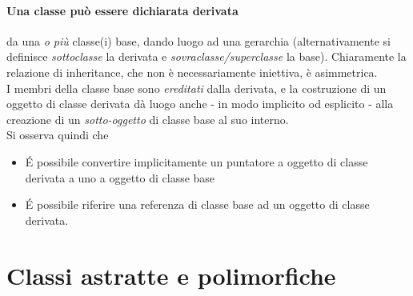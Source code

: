 \documentclass[10pt, oneside]{book}
\begin{document}
\paragraph{Una classe può essere dichiarata derivata} da una \textit{o più} classe(i) base, dando luogo ad una gerarchia (alternativamente si definisce \textit{sottoclasse} la derivata e \textit{sovraclasse/superclasse} la base). Chiaramente la relazione di inheritance, che non è necessariamente iniettiva, è asimmetrica.\\
I membri della classe base sono \textit{ereditati} dalla derivata, e la costruzione di un oggetto di classe derivata dà luogo anche - in modo implicito od esplicito - alla creazione di un \textit{sotto-oggetto} di classe base al suo interno.\\
Si osserva quindi che
\begin{itemize}
\item \'E possibile convertire implicitamente un puntatore a oggetto di classe derivata a uno a oggetto di classe base
\item \'E possibile riferire una referenza di classe base ad un oggetto di classe derivata.
\end{itemize}

\section{Classi astratte e polimorfiche}
\end{document}
